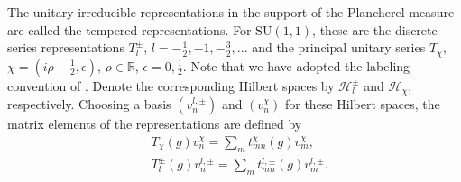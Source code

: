 \documentclass{amsart}
\theoremstyle{definition}
\theoremstyle{remark}
\numberwithin{equation}{section}
\begin{document}
The unitary irreducible representations in the support of the Plancherel measure are called the tempered representations. For $\mathrm{SU}(1,1)$, these are the discrete series representations $T_l^\pm$, $l=-\tfrac{1}{2},-1,-\tfrac{3}{2},...$ and the principal unitary series $T_\chi$, $\chi=(i\rho-\tfrac{1}{2},\epsilon)$, $\rho\in\mathbb{R}$, $\epsilon=0,\tfrac{1}{2}$. Note that we have adopted the labeling convention of \cite{vilenkin_klimyk_1991}. Denote the corresponding Hilbert spaces by $\mathcal{H}_l^\pm$ and $\mathcal{H}_\chi$, respectively. Choosing a basis $(v_n^{l,\pm})$ and $(v_n^\chi)$ for these Hilbert spaces, the matrix elements of the representations are defined by
\begin{equation}\label{eq_matrix_elements}
    \begin{aligned}
        &T_\chi(g)v_n^\chi=\sum_m t^\chi_{mn}(g)v^\chi_m,\\
        &T_l^\pm(g)v_n^{l,\pm}=\sum_m t^{l,\pm}_{mn}(g)v_m^{l,\pm}.
    \end{aligned}
\end{equation}
\end{document}
